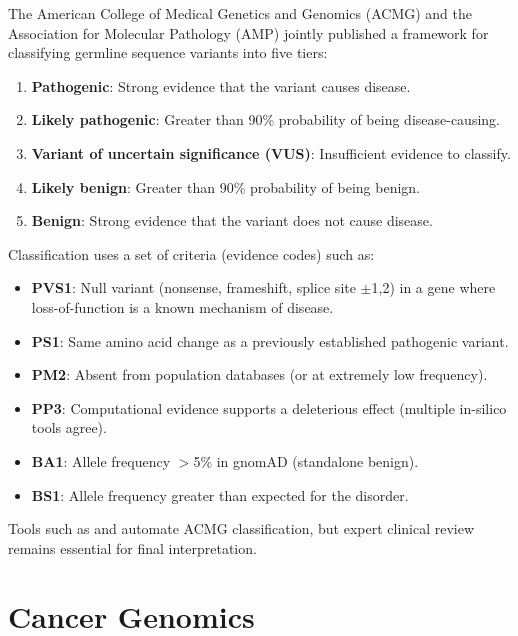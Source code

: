 The American College of Medical Genetics and Genomics (ACMG) and the Association for Molecular Pathology (AMP) jointly published a framework for classifying germline sequence variants into five tiers:

\begin{enumerate}[nosep]
  \item \textbf{Pathogenic}: Strong evidence that the variant causes disease.
  \item \textbf{Likely pathogenic}: Greater than 90\% probability of being disease-causing.
  \item \textbf{Variant of uncertain significance (VUS)}: Insufficient evidence to classify.
  \item \textbf{Likely benign}: Greater than 90\% probability of being benign.
  \item \textbf{Benign}: Strong evidence that the variant does not cause disease.
\end{enumerate}

Classification uses a set of criteria (evidence codes) such as:
\begin{itemize}[nosep]
  \item \textbf{PVS1}: Null variant (nonsense, frameshift, splice site $\pm$1,2) in a gene where loss-of-function is a known mechanism of disease.
  \item \textbf{PS1}: Same amino acid change as a previously established pathogenic variant.
  \item \textbf{PM2}: Absent from population databases (or at extremely low frequency).
  \item \textbf{PP3}: Computational evidence supports a deleterious effect (multiple in-silico tools agree).
  \item \textbf{BA1}: Allele frequency $>$5\% in gnomAD (standalone benign).
  \item \textbf{BS1}: Allele frequency greater than expected for the disorder.
\end{itemize}

Tools such as  and  automate ACMG classification, but expert clinical review remains essential for final interpretation.

\section{Cancer Genomics}
\label{sec:cancer_genomics}

